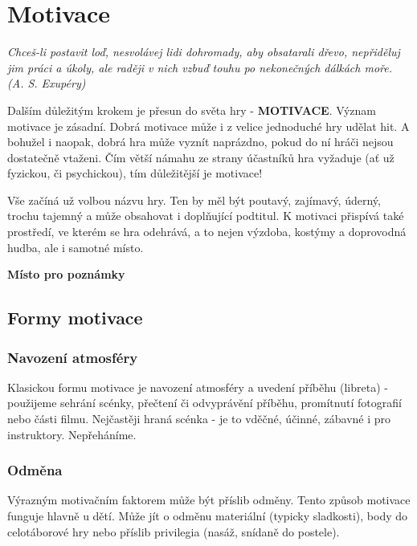 \documentclass[a4paper,12pt,final]{report}
\begin{document}
\newpage
\pagelogos
\chapter[Motivace]{Motivace}
\textit{Chceš-li postavit loď, nesvolávej lidi dohromady, aby obsatarali dřevo, nepřiděluj jim práci a úkoly, ale raději v nich vzbuď touhu po nekonečných dálkách moře. (A. S. Exupéry)}

Dalším důležitým krokem je přesun do světa hry - \textbf{MOTIVACE}. Význam motivace je zásadní. Dobrá motivace může i z velice jednoduché hry udělat hit. A bohužel i naopak, dobrá hra může vyznít naprázdno, pokud do ní hráči nejsou dostatečně vtaženi. Čím větší námahu ze strany účastníků hra vyžaduje (ať už fyzickou, či psychickou), tím důležitější je motivace!

Vše začíná už volbou názvu hry. Ten by měl být poutavý, zajímavý, úderný, trochu tajemný a může obsahovat i doplňující podtitul. K motivaci přispívá také prostředí, ve kterém se hra odehrává, a to nejen výzdoba, kostýmy a doprovodná hudba, ale i samotné místo.


\begin{samepage}\begin{flushleft}
\end{flushleft}
\textbf{Místo pro poznámky}
\vspace{4cm}
\end{samepage}

\section[Formy motivace]{Formy motivace}
\pagelogos
\subsection*{Navození atmosféry}
Klasickou formu motivace je navození atmosféry a uvedení příběhu (libreta)  - použijeme sehrání scénky, přečtení či odvyprávění příběhu, promítnutí fotografií nebo části filmu. Nejčastěji hraná scénka - je to vděčné, účinné, zábavné i pro instruktory. Nepřeháníme.

\subsection*{Odměna}
Výrazným motivačním faktorem může být příslib odměny. Tento způsob motivace funguje hlavně u dětí. Může jít o odměnu materiální (typicky sladkosti), body do celotáborové hry nebo příslib privilegia (nasáž, snídaně do postele).
\end{document}
